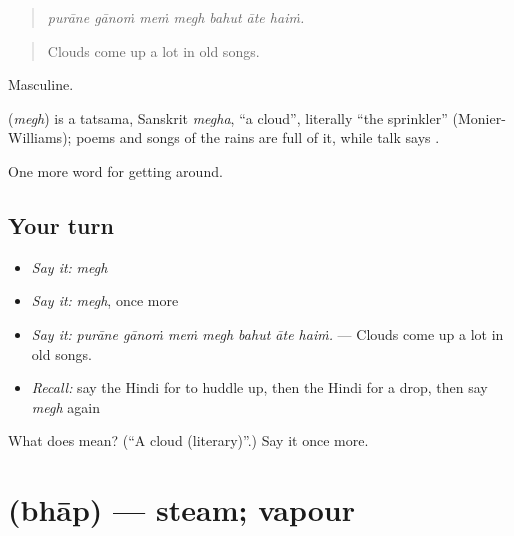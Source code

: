 \begin{quote}
      
\end{quote}

\begin{quote}
\emph{purāne gānoṁ meṁ megh bahut āte haiṁ.}
\end{quote}

\begin{quote}
Clouds come up a lot in old songs.
\end{quote}

Masculine.

\begin{cousinweb}
\textbf{} (\emph{megh}) is a tatsama, Sanskrit \emph{megha}, \textquotedblleft{}a cloud\textquotedblright{}, literally \textquotedblleft{}the sprinkler\textquotedblright{} (Monier-Williams); poems and songs of the rains are full of it, while talk says .
\end{cousinweb}

\begin{grammarlens}[title={What you've built}]
One more word for getting around.
\end{grammarlens}

\subsection*{Your turn}
\begin{itemize}
\raggedright
  \item \emph{Say it:} \emph{megh}
  \item \emph{Say it:} \emph{megh}, once more
  \item \emph{Say it:} \emph{purāne gānoṁ meṁ megh bahut āte haiṁ.} — Clouds come up a lot in old songs.
  \item \emph{Recall:} say the Hindi for to huddle up, then the Hindi for a drop, then say \emph{megh} again
\end{itemize}

\begin{tcolorbox}[breakable,colback=teal!4,colframe=teal!35!black,title={Before you move on}]
What does  mean? (\textquotedblleft{}A cloud (literary)\textquotedblright{}.) Say it once more.
\end{tcolorbox}
\section[\texorpdfstring{\hi{भाप} (bhāp)}{भाप (bhāp)}]{ (bhāp) — steam; vapour}

